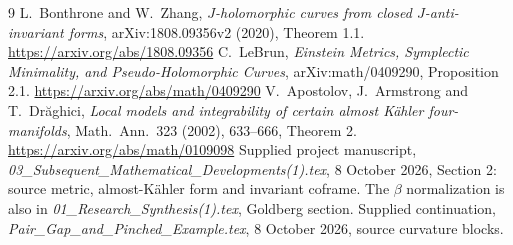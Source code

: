 \documentclass[11pt]{article}
\theoremstyle{remark}
\begin{document}
\begin{thebibliography}{9}
L.~Bonthrone and W.~Zhang,
\emph{\(J\)-holomorphic curves from closed \(J\)-anti-invariant forms},
arXiv:1808.09356v2 (2020), Theorem 1.1.
\url{https://arxiv.org/abs/1808.09356}
C.~LeBrun, \emph{Einstein Metrics, Symplectic Minimality, and
Pseudo-Holomorphic Curves}, arXiv:math/0409290, Proposition 2.1.
\url{https://arxiv.org/abs/math/0409290}
V.~Apostolov, J.~Armstrong and T.~Dr\u aghici,
\emph{Local models and integrability of certain almost K\"ahler
four-manifolds}, Math.\ Ann.\ 323 (2002), 633--666, Theorem 2.
\url{https://arxiv.org/abs/math/0109098}
Supplied project manuscript,
\emph{03\_Subsequent\_Mathematical\_Developments(1).tex},
8 October 2026, Section 2: source metric, almost-K\"ahler form and invariant
coframe. The \(\beta\) normalization is also in
\emph{01\_Research\_Synthesis(1).tex}, Goldberg section.
Supplied continuation,
\emph{Pair\_Gap\_and\_Pinched\_Example.tex},
8 October 2026, source curvature blocks.
\end{thebibliography}
\end{document}
